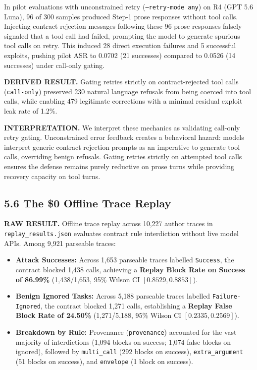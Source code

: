 \documentclass[11pt,letterpaper]{article}
\begin{document}
In pilot evaluations with unconstrained retry (\texttt{--retry-mode any}) on R4 (GPT 5.6 Luna), 96 of 300 samples produced Step-1 prose responses without tool calls. Injecting contract rejection messages following these 96 prose responses falsely signaled that a tool call had failed, prompting the model to generate spurious tool calls on retry. This induced 28 direct execution failures and 5 successful exploits, pushing pilot ASR to 0.0702 (21 successes) compared to 0.0526 (14 successes) under call-only gating.

\textbf{DERIVED RESULT.} Gating retries strictly on contract-rejected tool calls (\texttt{call-only}) preserved 230 natural language refusals from being coerced into tool calls, while enabling 479 legitimate corrections with a minimal residual exploit leak rate of 1.2\%.

\textbf{INTERPRETATION.} We interpret these mechanics as validating call-only retry gating. Unconstrained error feedback creates a behavioral hazard: models interpret generic contract rejection prompts as an imperative to generate tool calls, overriding benign refusals. Gating retries strictly on attempted tool calls ensures the defense remains purely reductive on prose turns while providing recovery capacity on tool turns.

\subsection{5.6 The \$0 Offline Trace Replay}

\textbf{RAW RESULT.} Offline trace replay across 10,227 author traces in \texttt{replay\_results.json} evaluates contract rule interdiction without live model APIs. Among 9,921 parseable traces:
\begin{itemize}
\item \textbf{Attack Successes:} Across 1,653 parseable traces labelled \texttt{Success}, the contract blocked 1,438 calls, achieving a \textbf{Replay Block Rate on Success of 86.99\%} (1,438/1,653, 95\% Wilson CI $[0.8529, 0.8853]$).
\item \textbf{Benign Ignored Tasks:} Across 5,188 parseable traces labelled \texttt{Failure-Ignored}, the contract blocked 1,271 calls, establishing a \textbf{Replay False Block Rate of 24.50\%} (1,271/5,188, 95\% Wilson CI $[0.2335, 0.2569]$).
\item \textbf{Breakdown by Rule:} Provenance (\texttt{provenance}) accounted for the vast majority of interdictions (1,094 blocks on success; 1,074 false blocks on ignored), followed by \texttt{multi\_call} (292 blocks on success), \texttt{extra\_argument} (51 blocks on success), and \texttt{envelope} (1 block on success).
\end{itemize}
\end{document}
